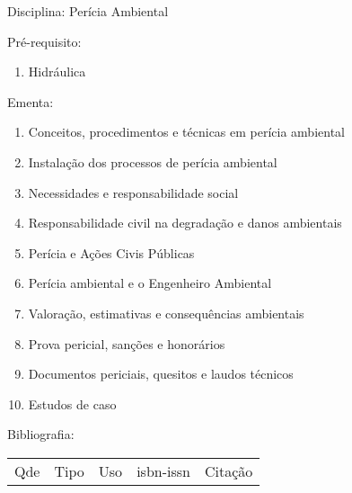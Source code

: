 \documentclass[12pt,a4paper,twoside]{report}
\begin{document}
Disciplina: Perícia Ambiental

Pré-requisito:
\begin{enumerate}
\item Hidráulica
\end{enumerate}

Ementa:
\begin{enumerate}
\item Conceitos, procedimentos e técnicas em perícia ambiental
\item Instalação dos processos de perícia ambiental
\item Necessidades e responsabilidade social
\item Responsabilidade civil na degradação e danos ambientais
\item Perícia e Ações Civis Públicas
\item Perícia ambiental e o Engenheiro Ambiental
\item Valoração, estimativas e consequências ambientais
\item Prova pericial, sanções e honorários
\item Documentos periciais, quesitos e laudos técnicos
\item Estudos de caso
\end{enumerate}

Bibliografia:
\begin{tabular}{lllll}
Qde & Tipo & Uso & isbn-issn & Citação \\
\end{tabular}
\end{document}
